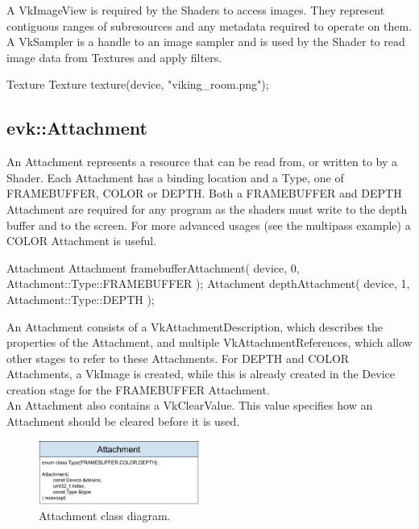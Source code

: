 \documentclass[12pt]{report}
\newcommand{\imagewidth}{0.47\textwidth}
\theoremstyle{definition}
\begin{document}
        A VkImageView is required by the Shaders to access images. They
        represent contiguous ranges of subresources and any metadata
        required to operate on them. A VkSampler is a handle to an image
        sampler and is used by the Shader to read image data from Textures
        and apply filters.

        \begin{usage}{Texture}
  Texture texture(device, "viking_room.png");
        \end{usage}

      \subsection{evk::Attachment}

        An Attachment represents a resource that can be read from, or written
        to by a Shader. Each Attachment has a binding location and a Type, one
        of FRAMEBUFFER, COLOR or DEPTH. Both a FRAMEBUFFER and DEPTH Attachment
        are required for any program as the shaders must write to the depth
        buffer and to the screen. For more advanced usages (see the multipass
        example) a COLOR Attachment is useful.

        \begin{usage}{Attachment}
  Attachment framebufferAttachment(
    device, 0, Attachment::Type::FRAMEBUFFER
  );
  Attachment depthAttachment(
    device, 1, Attachment::Type::DEPTH
  );
        \end{usage}

        An Attachment consists of a VkAttachmentDescription, which describes
        the properties of the Attachment, and multiple VkAttachmentReferences,
        which allow other stages to refer to these Attachments. For DEPTH and
        COLOR Attachments, a VkImage is created, while this is already created
        in the Device creation stage for the FRAMEBUFFER Attachment. \\

        An Attachment also contains a VkClearValue. This value specifies how an
        Attachment should be cleared before it is used. \\

        \begin{figure}[h]
          \centering
          \includegraphics[width=\imagewidth]{images/class_attachment.png}
          \caption{Attachment class diagram.}
          \label{fig:class_attachment}  
        \end{figure}
\end{document}
